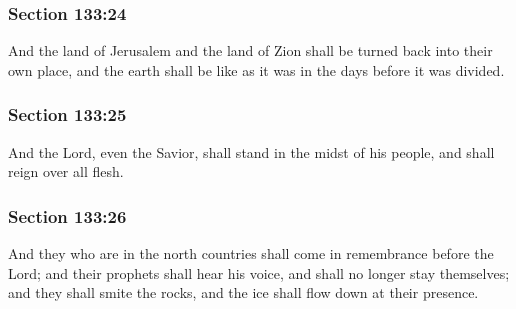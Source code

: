 	\subsubsection{Section 133:24} %
		\label{DC133-24}

		And the land of Jerusalem and the land of Zion shall be turned back into their own place, and the earth shall be like as it was in the days before it was divided.


	\subsubsection{Section 133:25} %
		\label{DC133-25}

		And the Lord, even the Savior, shall stand in the midst of his people, and shall reign over all flesh.


	\subsubsection{Section 133:26} %
		\label{DC133-26}

		And they who are in the north countries shall come in remembrance before the Lord; and their prophets shall hear his voice, and shall no longer stay themselves; and they shall smite the rocks, and the ice shall flow down at their presence.


